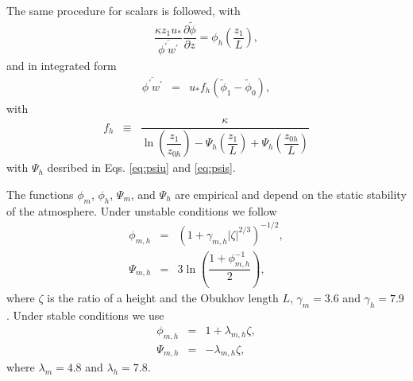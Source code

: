 \documentclass[gmd]{copernicus}
\newcommand{\phif}{\ensuremath{\widetilde{\phi}}}
\begin{document}
The same procedure for scalars is followed, with
\begin{eqnarray}
\dfrac{\kappa z_1 u_*}{\overline{\phi^\prime w^\prime}} \dfrac{\partial \phif}{\partial z} =
\phi_h \left( \dfrac{z_1}{L} \right),
\end{eqnarray}
and in integrated form
\begin{eqnarray}
\overline{\phi^\prime w^\prime} & = & u_* f_h \left( \phif_1 - \phif_0 \right),
\end{eqnarray}
with
\begin{eqnarray}
f_h & \equiv &
\dfrac{\kappa}
{ \ln{\left( \dfrac{z_1}{z_{0h}} \right)}
	- \varPsi_h \left( \dfrac{z_1}{L} \right)
	+ \varPsi_h \left( \dfrac{z_{0h}}{L} \right) }
\end{eqnarray}
with $\varPsi_h$ desribed in Eqs. \ref{eq:psiu} and \ref{eq:psis}.

The functions $\phi_m$, $\phi_h$, $\varPsi_m$, and $\varPsi_h$ are empirical and depend on the static stability of the atmosphere. Under unstable conditions we follow \citet{Wilson2001, Wyngaard2010} 
\begin{eqnarray}
\phi_{m,h} & = & \left( 1 + \gamma_{m,h} \left| \zeta \right|^{2/3} \right)^{-1/2},\label{eq:phiu}\\
\varPsi_{m,h} & = & 3 \ln{\left( \dfrac{1 + \phi_{m,h}^{-1}}{2} \right)},\label{eq:psiu} 
\end{eqnarray}
where $\zeta$ is the ratio of a height and the Obukhov length $L$, $\gamma_m = 3.6$ and $\gamma_h = 7.9$. Under stable conditions we use \citet{Hogstrom1988, Wyngaard2010}
\begin{eqnarray}
\phi_{m,h} & = & 1 + \lambda_{m,h} \zeta, \label{eq:phis}\\
\varPsi_{m,h} & = & - \lambda_{m,h} \zeta, \label{eq:psis}
\end{eqnarray}
where $\lambda_m = 4.8$ and $\lambda_h = 7.8$.
\end{document}
